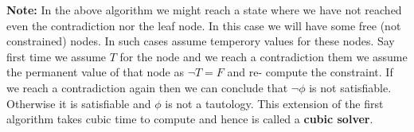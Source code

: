 \documentclass{article}
\begin{document}
\begin{enumerate}
\begin{answer}
\begin{enumerate}
  	\end{enumerate}
  	
  	\textbf{Note:} In the above algorithm we might reach a state where we have
  	  not reached even the contradiction nor the leaf node. In this case we will
  	  have some free (not constrained) nodes. In such cases assume temperory
  	  values for these nodes. Say first time we assume $T$ for the node and we
  	  reach a contradiction them we assume the permanent value of that node as
  	  $\neg T = F$ and re- compute the constraint. If we reach a contradiction
  	  again then we can conclude that $\neg \phi$ is not satisfiable. Otherwise
  	  it is satisfiable and $\phi$ is not a tautology. This extension of the
  	  first algorithm takes cubic time to compute and hence is called a
  	  \textbf{cubic solver}.
  \end{answer}

\end{enumerate}
\end{document}

